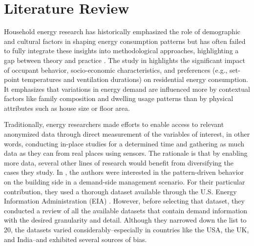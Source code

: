 \section{Literature Review}
\label{Sec-Literature}

Household energy research has historically emphasized the role of demographic and cultural factors in shaping energy consumption patterns but has often failed to fully integrate these insights into methodological approaches, highlighting a gap between theory and practice \cite{crosbieHOUSEHOLDENERGYSTUDIES2006}. The study in \cite{moraEnergyConsumptionResidential2018} highlights the significant impact of occupant behavior, socio-economic characteristics, and preferences (e.g., set-point temperatures and ventilation durations) on residential energy consumption. It emphasizes that variations in energy demand are influenced more by contextual factors like family composition and dwelling usage patterns than by physical attributes such as house size or floor area.

Traditionally, energy researchers made efforts to enable access to relevant anonymized data through direct measurement of the variables of interest, in other words, conducting in-place studies for a determined time and gathering as much data as they can from real places using sensors. The rationale is that by enabling more data, several other lines of research would benefit from diversifying the cases they study. In \cite{cruz2024pattern}, the authors were interested in the pattern-driven behavior on the building side in a demand-side management scenario. For their particular contribution, they used a thorough dataset available through the U.S. Energy Information Administration (EIA) \cite{hronis2020housing}. However, before selecting that dataset, they conducted a review of all the available datasets that contain demand information with the desired granularity and detail. Although they narrowed down the list to 20, the datasets varied considerably--especially in countries like the USA, the UK, and India--and exhibited several sources of bias.


